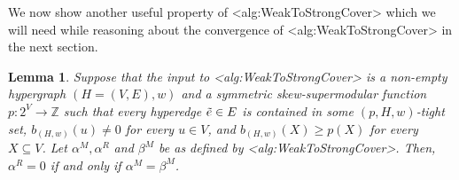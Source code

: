 \documentclass{article}
\def\Cref#1{<#1>}%
\newtheorem{lemma}{Lemma}[section]
\newcommand{\tightSetFamily}[1]{\ensuremath{T_{#1}}\xspace}
\providecommand{\Z}{\mathbb{Z}}
\begin{document}
We now show another useful property of \Cref{alg:WeakToStrongCover} which we will need while reasoning about the convergence of \Cref{alg:WeakToStrongCover} in the next section.
\begin{lemma}\label{lem:WeakToStrong:alpha^R=0-iff-alpha^M=beta^M}
Suppose that the input to \Cref{alg:WeakToStrongCover} is a non-empty hypergraph $(H = (V, E), w)$ and a symmetric skew-supermodular function $p:2^V\rightarrow \Z$
such that every hyperedge $\Tilde{e} \in E$ is contained in some $(p, H, w)$-tight set, $b_{(H,w)}(u) \not = 0$ for every $u \in V$, and $b_{(H,w)}(X) \geq p(X)$ for every $X \subseteq V$. 
 Let $\alpha^M, \alpha^R$ and $\beta^M$ be as defined by \Cref{alg:WeakToStrongCover}.  
 Then, $\alpha^R = 0$ if and only if $\alpha^M = \beta^M$.
\end{lemma}
\end{document}
